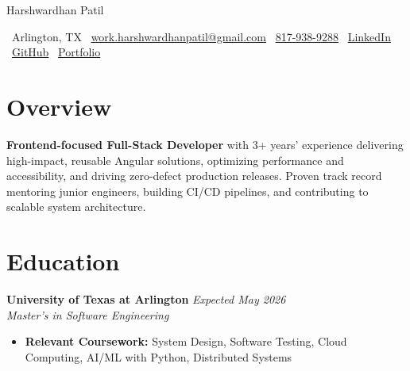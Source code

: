 \documentclass[10pt, letterpaper]{article}
\newenvironment{highlights}{\begin{itemize}[topsep=0.10 cm, parsep=0.10 cm, partopsep=0pt, itemsep=2pt, leftmargin=10pt]}{\end{itemize}}
\begin{document}
\newcommand{\AND}{\unskip\cleaders\copy\ANDbox\hskip\wd\ANDbox\ignorespaces}
\newsavebox\ANDbox
\sbox\ANDbox{$|$}

\begin{center}
    {\fontsize{25 pt}{25 pt}\selectfont Harshwardhan Patil}

    \vspace{10 pt}
    \normalsize
    \faMapMarker*\ Arlington, TX\hspace{1.2em}
    \faEnvelope\ \href{mailto:work.harshwardhanpatil@gmail.com}{work.harshwardhanpatil@gmail.com}\hspace{1.2em}
    \faPhone\ \href{tel:8179389288}{817-938-9288}\hspace{1.2em}
    \faLinkedin\ \href{https://www.linkedin.com/in/harshwardhanpatil23/}{LinkedIn}\hspace{1.2em}
    \faGithub\ \href{https://github.com/buffden}{GitHub}\hspace{1.2em}
    \faGlobe\ \href{https://buffden.github.io/buffden-portfolio/}{Portfolio}
\end{center}

\vspace{0.1 cm}
\newcommand{\educationentry}[4]{%
  \noindent\textbf{#1} \hfill \textit{#2}\\
  \textit{#3} \\
  #4
}
\section{Overview}
    \textbf{Frontend-focused Full-Stack Developer} with 3+ years’ experience delivering high-impact, reusable Angular solutions, optimizing performance and accessibility, and driving zero-defect production releases. Proven track record mentoring junior engineers, building CI/CD pipelines, and contributing to scalable system architecture.

\section{Education}
\educationentry
    {University of Texas at Arlington}
    {Expected May 2026}
    {Master’s in Software Engineering}
    {
    \begin{highlights}
        \item \textbf{Relevant Coursework:} System Design, Software Testing, Cloud Computing, AI/ML with Python, Distributed Systems
        \end{highlights}
    }
    
\end{document}
